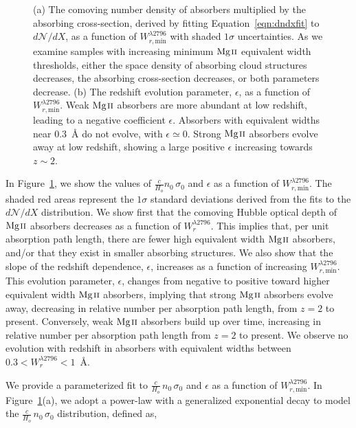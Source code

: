 \documentclass[iop,apj,numberedappendix,appendixfloats,twocolappendix]{emulateapj}
\begin{document}
\begin{figure*}[bth]
\caption{(a) The comoving number density of absorbers multiplied by the absorbing cross-section, derived by fitting Equation~\ref{eqn:dndxfit} to $d\mathcal{N}\!/dX$, as a function of $W_{r,\mathrm{min}}^{\lambda2796}$ with shaded $1\sigma$ uncertainties. As we examine samples with increasing minimum ${\hbox{{\rm Mg}\kern 0.1em{\sc ii}}}$ equivalent width thresholds, either the space density of absorbing cloud structures decreases, the absorbing cross-section decreases, or both parameters decrease. (b) The redshift evolution parameter, $\epsilon$, as a function of $W_{r,\mathrm{min}}^{\lambda2796}$. Weak ${\hbox{{\rm Mg}\kern 0.1em{\sc ii}}}$ absorbers are more abundant at low redshift, leading to a negative coefficient $\epsilon$. Absorbers with equivalent widths near $0.3$~{\AA} do not evolve, with $\epsilon \simeq 0$. Strong ${\hbox{{\rm Mg}\kern 0.1em{\sc ii}}}$ absorbers evolve away at low redshift, showing a large positive $\epsilon$ increasing towards $z \sim 2$.}
\label{fig:nsigmaepsilon}
\end{figure*}

In Figure~\ref{fig:nsigmaepsilon}, we show the values of $\frac{c}{H_o}n_0\,\sigma_0$ and $\epsilon$ as a function of $W_{r,\mathrm{min}}^{\lambda2796}$. The shaded red areas represent the $1\sigma$ standard deviations derived from the fits to the $d\mathcal{N}\!/dX$ distribution. We show first that the comoving Hubble optical depth of ${\hbox{{\rm Mg}\kern 0.1em{\sc ii}}}$ absorbers decreases as a function of $W_r^{\lambda2796}$. This implies that, per unit absorption path length, there are fewer high equivalent width ${\hbox{{\rm Mg}\kern 0.1em{\sc ii}}}$ absorbers, and/or that they exist in smaller absorbing structures. We also show that the slope of the redshift dependence, $\epsilon$, increases as a function of increasing $W_{r,\mathrm{min}}^{\lambda2796}$. This evolution parameter, $\epsilon$, changes from negative to positive toward higher equivalent width ${\hbox{{\rm Mg}\kern 0.1em{\sc ii}}}$ absorbers, implying that strong ${\hbox{{\rm Mg}\kern 0.1em{\sc ii}}}$ absorbers evolve away, decreasing in relative number per absorption path length, from $z = 2$ to present. Conversely, weak ${\hbox{{\rm Mg}\kern 0.1em{\sc ii}}}$ absorbers build up over time, increasing in relative number per absorption path length from $z = 2$ to present. We observe no evolution with redshift in absorbers with equivalent widths between $0.3 < W_r^{\lambda2796} < 1$~{\AA}.

We provide a parameterized fit to $\frac{c}{H_o}\,n_0\,\sigma_0$ and $\epsilon$ as a function of $W_{r,\mathrm{min}}^{\lambda2796}$. In Figure~\ref{fig:nsigmaepsilon}(a), we adopt a power-law with a generalized exponential decay to model the $\frac{c}{H_o}\,n_0\,\sigma_0$ distribution, defined as,
\end{document}
